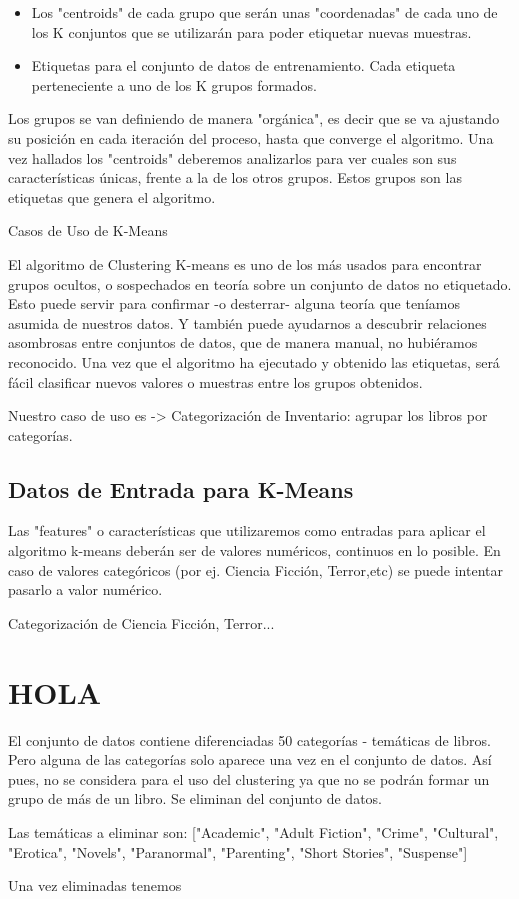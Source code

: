 \documentclass{uimppracticas}
\begin{document}
\begin{itemize}
	\item Los "centroids" de cada grupo que serán unas "coordenadas" de cada uno de los K conjuntos que se utilizarán para poder etiquetar nuevas muestras.
	\item Etiquetas para el conjunto de datos de entrenamiento. Cada etiqueta perteneciente a uno de los K grupos formados.
\end{itemize}

Los grupos se van definiendo de manera "orgánica", es decir que se va ajustando su posición en cada iteración del proceso, hasta que converge el algoritmo. Una vez hallados los "centroids" deberemos analizarlos para ver cuales son sus características únicas, frente a la de los otros grupos. Estos grupos son las etiquetas que genera el algoritmo.

Casos de Uso de K-Means

El algoritmo de Clustering K-means es uno de los más usados para encontrar grupos ocultos, o sospechados en teoría sobre un conjunto de datos no etiquetado. Esto puede servir para confirmar -o desterrar- alguna teoría que teníamos asumida de nuestros datos. Y también puede ayudarnos a descubrir relaciones asombrosas entre conjuntos de datos, que de manera manual, no hubiéramos reconocido. Una vez que el algoritmo ha ejecutado y obtenido las etiquetas, será fácil clasificar nuevos valores o muestras entre los grupos obtenidos.

Nuestro caso de uso es -> Categorización de Inventario: agrupar los libros por categorías.

\subsection{Datos de Entrada para K-Means}

Las "features" o características que utilizaremos como entradas para aplicar el algoritmo k-means deberán ser de valores numéricos, continuos en lo posible. En caso de valores categóricos (por ej. Ciencia Ficción, Terror,etc) se puede intentar pasarlo a valor numérico.

Categorización de  Ciencia Ficción, Terror...

\section{HOLA}

El conjunto de datos contiene diferenciadas 50 categorías - temáticas de libros. Pero alguna de las categorías solo aparece una vez en el conjunto de datos. Así pues, no se considera para el uso del clustering ya que no se podrán formar un grupo de más de un libro. Se eliminan del conjunto de datos. 

Las temáticas a eliminar son: ["Academic", "Adult Fiction", "Crime", "Cultural", "Erotica", "Novels", "Paranormal", "Parenting", "Short Stories", "Suspense"]

Una vez eliminadas tenemos 

\newpage
\renewcommand{\refname}{Bibliografía}


\end{document}
